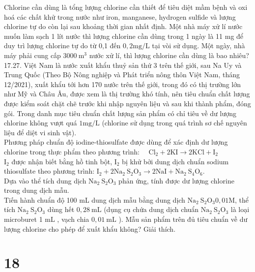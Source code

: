 \documentclass[10pt]{article}
\begin{document}
Chlorine cần dùng là tổng lượng chlorine cần thiết để tiêu diệt mầm bệnh và oxi hoá các chất khử trong nước như iron, manganese, hydrogen sulfide và lượng chlorine tự do còn lại sau khoảng thời gian nhất định. Một nhà máy xử lí nước muốn làm sạch 1 lít nước thì lượng chlorine cần dùng trong 1 ngày là 11 mg để duy trì lượng chlorine tự do từ 0,1 đến $0,2 \mathrm{mg} / \mathrm{L}$ tại vòi sử dụng. Một ngày, nhà máy phải cung cấp $3000 \mathrm{~m}^{3}$ nước xử lí, thì lượng chlorine cần dùng là bao nhiêu?\\
17.27. Việt Nam là nước xuất khẩu thuỷ sản thứ 3 trên thế giới, sau Na Uy và Trung Quốc (Theo Bộ Nông nghiệp và Phát triển nông thôn Việt Nam, tháng 12/2021), xuất khẩu tới hơn 170 nước trên thế giới, trong đó có thị trường lớn như Mỹ và Châu Âu, được xem là thị trường khó tính, nên tiêu chuẩn chất lượng được kiểm soát chặt chẽ trước khi nhập nguyên liệu và sau khi thành phẩm, đóng gói. Trong danh mục tiêu chuẩn chất lượng sản phẩm có chỉ tiêu về dư lượng chlorine không vượt quá $1 \mathrm{mg} / \mathrm{L}$ (chlorine sử dụng trong quá trình sơ chế nguyên liệu để diệt vi sinh vật).\\
Phương pháp chuẩn độ iodine-thiosulfate được dùng để xác định dư lượng chlorine trong thực phẩm theo phương trình: $\quad \mathrm{Cl}_{2}+2 \mathrm{KI} \rightarrow 2 \mathrm{KCl}+\mathrm{I}_{2}$\\
$\mathrm{I}_{2}$ được nhận biết bằng hồ tinh bột, $\mathrm{I}_{2}$ bị khử bởi dung dịch chuẩn sodium thiosulfate theo phương trình: $\mathrm{I}_{2}+2 \mathrm{Na}_{2} \mathrm{~S}_{2} \mathrm{O}_{3} \rightarrow 2 \mathrm{NaI}+\mathrm{Na}_{2} \mathrm{~S}_{4} \mathrm{O}_{6}$.\\
Dựa vào thể tích dung dịch $\mathrm{Na}_{2} \mathrm{~S}_{2} \mathrm{O}_{3}$ phản ứng, tính được dư lượng chlorine trong dung dịch mẫu.\\
Tiến hành chuẩn độ 100 mL dung dịch mẫu bằng dung dịch $\mathrm{Na}_{2} \mathrm{~S}_{2} \mathrm{O}_{3} 0,01 \mathrm{M}$, thể tích $\mathrm{Na}_{2} \mathrm{~S}_{2} \mathrm{O}_{3}$ dùng hết $0,28 \mathrm{~mL}$ (dụng cụ chứa dung dịch chuẩn $\mathrm{Na}_{2} \mathrm{~S}_{2} \mathrm{O}_{3}$ là loại microburet 1 mL , vạch chia $0,01 \mathrm{~mL}$ ). Mẫu sản phẩm trên đủ tiêu chuẩn về dư lượng chlorine cho phép để xuất khẩu không? Giải thích.

\section*{18}
\end{document}
